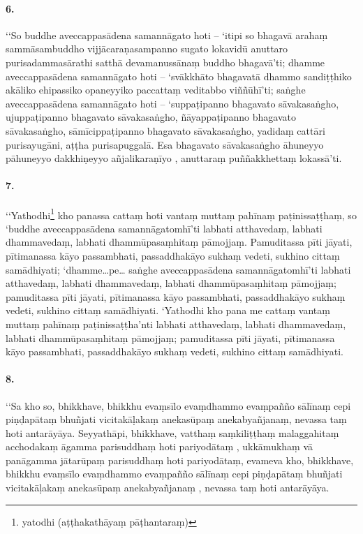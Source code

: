 \paragraph{6.} ‘‘So buddhe aveccappasādena samannāgato hoti – ‘itipi so bhagavā arahaṃ sammāsambuddho vijjācaraṇasampanno sugato lokavidū anuttaro purisadammasārathi satthā devamanussānaṃ buddho bhagavā’ti; dhamme aveccappasādena samannāgato hoti – ‘svākkhāto bhagavatā dhammo sandiṭṭhiko akāliko ehipassiko opaneyyiko paccattaṃ veditabbo viññūhī’ti; saṅghe aveccappasādena samannāgato hoti – ‘suppaṭipanno bhagavato sāvakasaṅgho, ujuppaṭipanno bhagavato sāvakasaṅgho, ñāyappaṭipanno bhagavato sāvakasaṅgho, sāmīcippaṭipanno bhagavato sāvakasaṅgho, yadidaṃ cattāri purisayugāni, aṭṭha purisapuggalā. Esa bhagavato sāvakasaṅgho āhuneyyo pāhuneyyo dakkhiṇeyyo añjalikaraṇīyo , anuttaraṃ puññakkhettaṃ lokassā’ti.

\paragraph{7.} ‘‘Yathodhi\footnote{yatodhi (aṭṭhakathāyaṃ pāṭhantaraṃ)} kho panassa cattaṃ hoti vantaṃ muttaṃ pahīnaṃ paṭinissaṭṭhaṃ, so ‘buddhe aveccappasādena samannāgatomhī’ti labhati atthavedaṃ, labhati dhammavedaṃ, labhati dhammūpasaṃhitaṃ pāmojjaṃ. Pamuditassa pīti jāyati, pītimanassa kāyo passambhati, passaddhakāyo sukhaṃ vedeti, sukhino cittaṃ samādhiyati; ‘dhamme…pe… saṅghe aveccappasādena samannāgatomhī’ti labhati atthavedaṃ, labhati dhammavedaṃ, labhati dhammūpasaṃhitaṃ pāmojjaṃ; pamuditassa pīti jāyati, pītimanassa kāyo passambhati, passaddhakāyo sukhaṃ vedeti, sukhino cittaṃ samādhiyati. ‘Yathodhi kho pana me cattaṃ vantaṃ muttaṃ pahīnaṃ paṭinissaṭṭha’nti labhati atthavedaṃ, labhati dhammavedaṃ, labhati dhammūpasaṃhitaṃ pāmojjaṃ; pamuditassa pīti jāyati, pītimanassa kāyo passambhati, passaddhakāyo sukhaṃ vedeti, sukhino cittaṃ samādhiyati.

\paragraph{8.} ‘‘Sa kho so, bhikkhave, bhikkhu evaṃsīlo evaṃdhammo evaṃpañño sālīnaṃ cepi piṇḍapātaṃ bhuñjati vicitakāḷakaṃ anekasūpaṃ anekabyañjanaṃ, nevassa taṃ hoti antarāyāya. Seyyathāpi, bhikkhave, vatthaṃ saṃkiliṭṭhaṃ malaggahitaṃ acchodakaṃ āgamma parisuddhaṃ hoti pariyodātaṃ , ukkāmukhaṃ vā panāgamma jātarūpaṃ parisuddhaṃ hoti pariyodātaṃ, evameva kho, bhikkhave, bhikkhu evaṃsīlo evaṃdhammo evaṃpañño sālīnaṃ cepi piṇḍapātaṃ bhuñjati vicitakāḷakaṃ anekasūpaṃ anekabyañjanaṃ , nevassa taṃ hoti antarāyāya.

